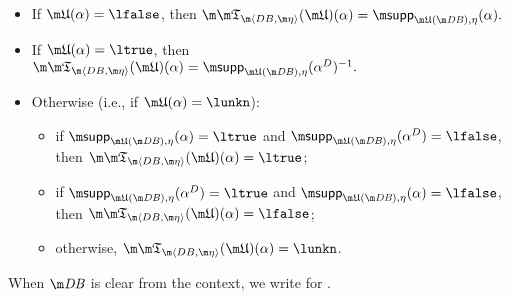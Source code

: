 \begin{definition}
\begin{itemize}
 \item If $\UUU(\alpha)=\lfalse$, then $\Apfull(\UUU)(\alpha) = \supp_{\UUU(\db),\eta}(\alpha).$
 \item If $\UUU(\alpha)=\ltrue$, then $\Apfull(\UUU)(\alpha) = \supp_{\UUU(\db),\eta}(\alpha^D)^{-1}.$
 \item Otherwise (i.e., if $\UUU(\alpha) = \lunkn$):
  \begin{itemize}
    \item if $\supp_{\UUU(\db),\eta}(\alpha) = \ltrue$ and $\supp_{\UUU(\db),\eta}(\alpha^D)=\lfalse$, then $\Apfull(\UUU)( \alpha)=\ltrue$;
    \item if $\supp_{\UUU(\db),\eta}(\alpha^D) = \ltrue$ and $\supp_{\UUU(\db),\eta}(\alpha)=\lfalse$, then $\Apfull(\UUU)(\alpha)=\lfalse$;
    \item otherwise, $\Apfull(\UUU)(\alpha)=\lunkn$.
\end{itemize}

\end{itemize}
When $\db$ is clear from the context, we write \Ap for \Apfull.
 
\end{definition}
% 

